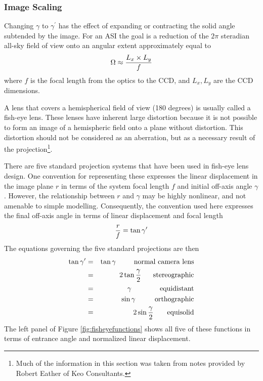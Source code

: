 \documentclass[11pt,twoside]{article}   %
\begin{document}
 \subsubsection{Image Scaling}
Changing $\gamma$ to $\gamma^\prime$ has the effect of expanding
or contracting the solid angle subtended by the image.  For an ASI
the goal is a reduction of the $2\pi$ steradian all-sky field of
view onto an angular extent approximately equal to
 \begin{equation}
  \Omega \approx {{L_x \times L_y} \over f}
 \end{equation}
where $f$ is the focal length from the optics to the CCD, and
$L_x,L_y$ are the CCD dimensions.

A lens that covers a hemispherical field of view (180 degrees) is
usually called a fish-eye lens.  These lenses have inherent large
distortion because it is not possible to form an image of a
hemispheric field onto a plane without distortion.  This
distortion should not be considered as an aberration, but as a
necessary result of the projection\footnote{Much of the
information in this section was taken from notes provided by
Robert Eather of Keo Consultants.}.

There are five standard projection systems that have been used in
fish-eye lens design.  One convention for representing these
expresses the linear displacement in the image plane $r$ in terms
of the system focal length $f$ and initial off-axis angle
$\gamma$. However, the relationship between $r$ and $\gamma$ may
be highly nonlinear, and not amenable to simple modelling.
Consequently, the convention used here expresses the final
off-axis angle in terms of linear displacement and focal length
 \begin{equation}
  {r\over f} = \tan\gamma^\prime
 \end{equation}
The equations governing the five standard projections are then
%
 \begin{eqnarray}
  \tan\gamma^\prime &=& \tan\gamma  \mbox{\hspace{5.9ex}normal camera lens}\\
   &=& 2 \tan{\gamma\over 2}  \mbox{\hspace{3.9ex}stereographic} \\
   &=& \gamma  \mbox{\hspace{9.35ex}equidistant}\\
   &=& \sin\gamma  \mbox{\hspace{6.35ex}orthographic} \\
   &=& 2\sin{\gamma\over 2} \mbox{\hspace{4.45ex}equisolid}
 \end{eqnarray}
%
The left panel of Figure \ref{fig:fisheyefunctions} shows all five
of these functions in terms of entrance angle and normalized
linear displacement.
\end{document}
